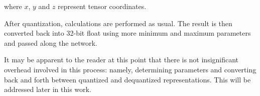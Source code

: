 where $x$, $y$ and $z$ represent tensor coordinates.

After quantization, calculations are performed as usual. The result is then converted back into 32-bit float using more minimum and maximum parameters and passed along the network.

It may be apparent to the reader at this point that there is not insignificant overhead involved in this process: namely, determining parameters and converting back and forth between quantized and dequantized representations. This will be addressed later in this work.